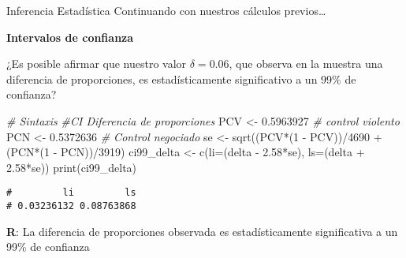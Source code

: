 \documentclass[
  8pt,
  ignorenonframetext,
]{beamer}
\newenvironment{Shaded}{\begin{snugshade}}{\end{snugshade}}
\newcommand{\AttributeTok}[1]{\textcolor[rgb]{0.77,0.63,0.00}{#1}}
\newcommand{\CommentTok}[1]{\textcolor[rgb]{0.56,0.35,0.01}{\textit{#1}}}
\newcommand{\DecValTok}[1]{\textcolor[rgb]{0.00,0.00,0.81}{#1}}
\newcommand{\FloatTok}[1]{\textcolor[rgb]{0.00,0.00,0.81}{#1}}
\newcommand{\FunctionTok}[1]{\textcolor[rgb]{0.00,0.00,0.00}{#1}}
\newcommand{\NormalTok}[1]{#1}
\newcommand{\OtherTok}[1]{\textcolor[rgb]{0.56,0.35,0.01}{#1}}
\newcommand{\SpecialCharTok}[1]{\textcolor[rgb]{0.00,0.00,0.00}{#1}}
\begin{document}
\begin{frame}[fragile]{Inferencia Estadística}
\protect\hypertarget{inferencia-estaduxedstica}{}
Continuando con nuestros cálculos previos\ldots{}

\textbf{Intervalos de confianza}

¿Es posible afirmar que nuestro valor \(\delta= 0.06\), que observa en
la muestra una diferencia de proporciones, es estadísticamente
significativo a un 99\% de confianza?

\begin{Shaded}
\begin{Highlighting}[]
\CommentTok{\# Sintaxis}
\CommentTok{\#CI Diferencia de proporciones}
\NormalTok{PCV  }\OtherTok{\textless{}{-}} \FloatTok{0.5963927} \CommentTok{\# control violento}
\NormalTok{PCN  }\OtherTok{\textless{}{-}} \FloatTok{0.5372636} \CommentTok{\# Control negociado}
\NormalTok{se }\OtherTok{\textless{}{-}}  \FunctionTok{sqrt}\NormalTok{((PCV}\SpecialCharTok{*}\NormalTok{(}\DecValTok{1} \SpecialCharTok{{-}}\NormalTok{ PCV))}\SpecialCharTok{/}\DecValTok{4690} \SpecialCharTok{+}\NormalTok{  (PCN}\SpecialCharTok{*}\NormalTok{(}\DecValTok{1} \SpecialCharTok{{-}}\NormalTok{ PCN))}\SpecialCharTok{/}\DecValTok{3919}\NormalTok{)}
\NormalTok{ci99\_delta }\OtherTok{\textless{}{-}}  \FunctionTok{c}\NormalTok{(}\AttributeTok{li=}\NormalTok{(delta }\SpecialCharTok{{-}} \FloatTok{2.58}\SpecialCharTok{*}\NormalTok{se), }\AttributeTok{ls=}\NormalTok{(delta }\SpecialCharTok{+} \FloatTok{2.58}\SpecialCharTok{*}\NormalTok{se)) }
\FunctionTok{print}\NormalTok{(ci99\_delta)}
\end{Highlighting}
\end{Shaded}

\begin{verbatim}
#         li         ls 
# 0.03236132 0.08763868
\end{verbatim}

\textbf{R}: La diferencia de proporciones observada es estadísticamente
significativa a un 99\% de confianza
\end{frame}
\end{document}
